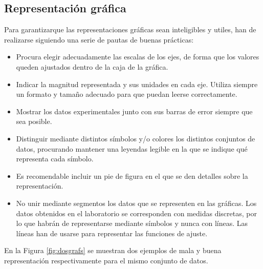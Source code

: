 \documentclass{book}
\begin{document}
\subsection{Representación gráfica}
Para garantizarque las representaciones gráficas sean inteligibles y utiles, han de realizarse 
siguiendo una serie de pautas de buenas prácticas:

\begin{itemize}
  \item Procura elegir adecuadamente las escalas de los ejes, de forma que los valores queden
  ajustados dentro de la caja de la gráfica.
  \item Indicar la magnitud representada y sus unidades en cada eje. Utiliza siempre un formato y
  tamaño adecuado para que puedan leerse correctamente.
  \item Mostrar los datos experimentales junto con sus barras de error siempre que sea posible.
  \item Distinguir mediante distintos símbolos y/o colores los distintos conjuntos de datos,
  procurando mantener una leyendas legible en la que se indique qué representa cada símbolo.
  \item Es recomendable incluir un pie de figura en el que se den detalles sobre la representación.
  \item No unir mediante segmentos los datos que se representen en las gráficas. Los datos obtenidos
  en el laboratorio se corresponden con medidas discretas, por lo que habrán de representarse
  mediante símbolos y nunca con líneas. Las líneas han de usarse para representar las funciones de
  ajuste.
\end{itemize}

En la Figura \ref{fig:dosgrafs} se muestran dos ejemplos de mala y buena representación 
respectivamente para el mismo conjunto de datos.
\end{document}
